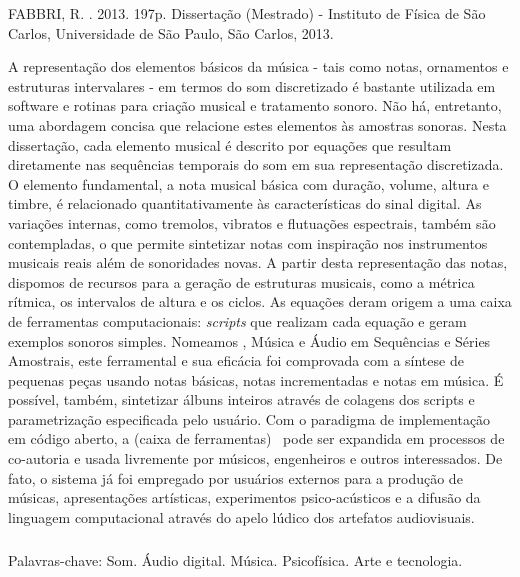 \begin{resumo2}
\vspace{-10mm}
FABBRI, R. \textbf{\ABNTtitulodata}. 2013. 197p. Dissertação (Mestrado) - Instituto de Física de São Carlos, Universidade de São Paulo, São Carlos, 2013.
\vspace{15mm}

A representação dos elementos básicos da música - tais como notas, ornamentos e estruturas intervalares - em termos do som discretizado é bastante utilizada em software e rotinas para criação musical e tratamento sonoro. Não há, entretanto, uma abordagem concisa que relacione estes elementos às amostras sonoras. Nesta dissertação, cada elemento musical é descrito por equações que resultam diretamente nas sequências temporais do som em sua representação discretizada. O elemento fundamental, a nota musical básica com duração, volume, altura e timbre, é relacionado quantitativamente às características do sinal digital. As variações internas, como tremolos, vibratos e flutuações espectrais, também são contempladas, o que permite sintetizar notas com inspiração nos instrumentos musicais reais além de sonoridades novas. A partir desta representação das notas, dispomos de recursos para a geração de estruturas musicais, como a métrica rítmica, os intervalos de altura e os ciclos. As equações deram origem a uma caixa de ferramentas computacionais: \emph{scripts} que realizam cada equação e geram exemplos sonoros simples. Nomeamos \massa, Música e Áudio em Sequências e Séries Amostrais, este ferramental e sua eficácia foi comprovada com a síntese de pequenas peças usando notas básicas, notas incrementadas e notas em música. É possível, também, sintetizar álbuns inteiros através de colagens dos scripts e parametrização especificada pelo usuário. Com o paradigma de implementação em código aberto, a (caixa de ferramentas) \massa\  pode ser expandida em processos de co-autoria e usada livremente por músicos, engenheiros e outros interessados. De fato, o sistema já foi empregado por usuários externos para a produção de músicas, apresentações artísticas, experimentos psico-acústicos e a difusão da linguagem computacional através do apelo lúdico dos artefatos audiovisuais.


$\phantom{linha em branco}$\\
Palavras-chave: Som. Áudio digital. Música. Psicofísica. Arte e tecnologia.

\end{resumo2}


\afterpage{\blankpage}

